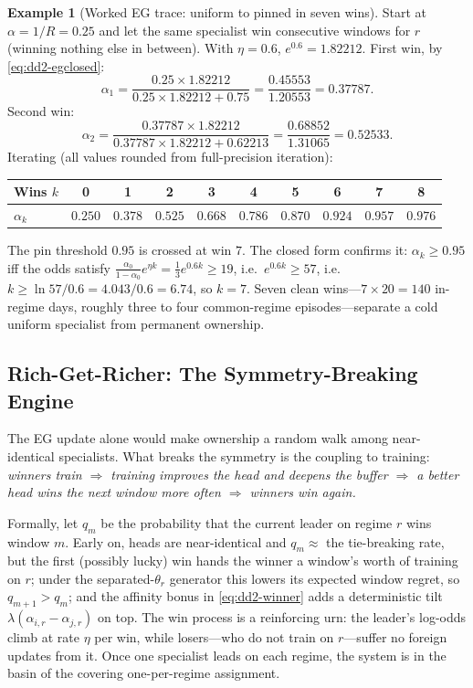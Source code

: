 \documentclass[11pt,a4paper]{article}
\theoremstyle{definition}
\newtheorem{example}{Example}[section]
\theoremstyle{plain}
\begin{document}
\begin{example}[Worked EG trace: uniform to pinned in seven wins]
\label{ex:dd2-egtrace}
Start at $\alpha = 1/R = 0.25$ and let the same specialist win consecutive
windows for $r$ (winning nothing else in between). With $\eta = 0.6$,
$e^{0.6} = 1.82212$. First win, by \eqref{eq:dd2-egclosed}:
\[
\alpha_1 = \frac{0.25 \times 1.82212}{0.25 \times 1.82212 + 0.75}
= \frac{0.45553}{1.20553} = 0.37787.
\]
Second win:
\[
\alpha_2 = \frac{0.37787 \times 1.82212}{0.37787 \times 1.82212 + 0.62213}
= \frac{0.68852}{1.31065} = 0.52533.
\]
Iterating (all values rounded from full-precision iteration):

\begin{center}
\begin{tabular}{lccccccccc}
\toprule
Wins $k$ & 0 & 1 & 2 & 3 & 4 & 5 & 6 & 7 & 8 \\
\midrule
$\alpha_k$ & $0.250$ & $0.378$ & $0.525$ & $0.668$ & $0.786$ & $0.870$ & $0.924$ & $\mathbf{0.957}$ & $0.976$ \\
\bottomrule
\end{tabular}
\end{center}

The pin threshold $0.95$ is crossed at win $7$. The closed form confirms it:
$\alpha_k \ge 0.95$ iff the odds satisfy
$\tfrac{\alpha_0}{1-\alpha_0} e^{\eta k} = \tfrac13 e^{0.6k} \ge 19$, i.e.\
$e^{0.6k} \ge 57$, i.e.\ $k \ge \ln 57 / 0.6 = 4.043/0.6 = 6.74$, so
$k = 7$. Seven clean wins---$7 \times 20 = 140$ in-regime days, roughly three
to four common-regime episodes---separate a cold uniform specialist from
permanent ownership.
\end{example}

\subsection{Rich-Get-Richer: The Symmetry-Breaking Engine}

The EG update alone would make ownership a random walk among near-identical
specialists. What breaks the symmetry is the coupling to training:
\emph{winners train $\Rightarrow$ training improves the head and deepens the
buffer $\Rightarrow$ a better head wins the next window more often
$\Rightarrow$ winners win again.}

Formally, let $q_m$ be the probability that the current leader on regime $r$
wins window $m$. Early on, heads are near-identical and $q_m \approx$ the
tie-breaking rate, but the first (possibly lucky) win hands the winner a
window's worth of training on $r$; under the separated-$\theta_r$ generator
this lowers its expected window regret, so $q_{m+1} > q_m$; and the affinity
bonus in \eqref{eq:dd2-winner} adds a deterministic tilt
$\lambda(\alpha_{i,r} - \alpha_{j,r})$ on top. The win process is a
reinforcing urn: the leader's log-odds climb at rate $\eta$ per win, while
losers---who do not train on $r$---suffer no foreign updates from it. Once
one specialist leads on each regime, the system is in the basin of the
covering one-per-regime assignment.
\end{document}
